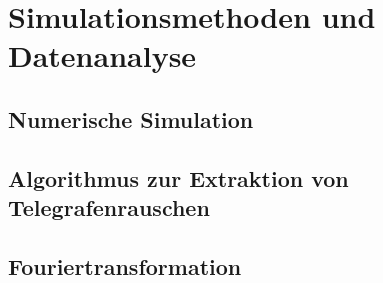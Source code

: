 \documentclass[main.tex]{subfiles}
\begin{document}
\section{Simulationsmethoden und Datenanalyse}

\subsection[short]{Numerische Simulation}

\subsection[short]{Algorithmus zur Extraktion von Telegrafenrauschen}

\subsection[short]{Fouriertransformation}
\end{document}
